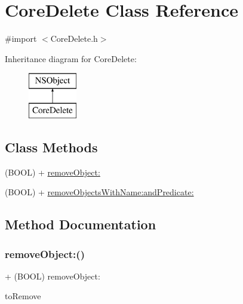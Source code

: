 \hypertarget{interface_core_delete}{}\section{Core\+Delete Class Reference}
\label{interface_core_delete}


{\ttfamily \#import $<$Core\+Delete.\+h$>$}

Inheritance diagram for Core\+Delete\+:\begin{figure}[H]
\begin{center}
\leavevmode
\includegraphics[height=2.000000cm]{interface_core_delete}
\end{center}
\end{figure}
\subsection*{Class Methods}
\begin{DoxyCompactItemize}
\item 
(B\+O\+OL) + \hyperlink{interface_core_delete_ad45d12395045c6bbb62a9eaa4b355f9d}{remove\+Object\+:}
\item 
(B\+O\+OL) + \hyperlink{interface_core_delete_a7ffa2b9844f49876942e80f83eea579f}{remove\+Objects\+With\+Name\+:and\+Predicate\+:}
\end{DoxyCompactItemize}


\subsection{Method Documentation}
\hypertarget{interface_core_delete_ad45d12395045c6bbb62a9eaa4b355f9d}{}\label{interface_core_delete_ad45d12395045c6bbb62a9eaa4b355f9d} 
\subsubsection{\texorpdfstring{remove\+Object\+:()}{removeObject:()}}
{\footnotesize\ttfamily + (B\+O\+OL) remove\+Object\+: \begin{DoxyParamCaption}\item[{(N\+S\+Managed\+Object $\ast$)}]{to\+Remove }\end{DoxyParamCaption}}

